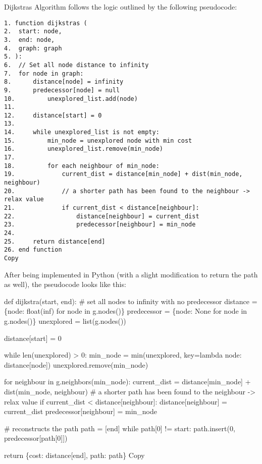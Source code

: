 \documentclass[
]{article}
\newenvironment{Shaded}{}{}
\newcommand{\NormalTok}[1]{#1}
\begin{document}
Dijkstra\textquotesingle s Algorithm follows the logic outlined by the
following pseudocode:

\begin{verbatim}
1. function dijkstras (
2.  start: node, 
3.  end: node,
4.  graph: graph
5. ):
6.  // Set all node distance to infinity
7.  for node in graph:
8.      distance[node] = infinity
9.      predecessor[node] = null
10.         unexplored_list.add(node)
11.         
12.     distance[start] = 0
13.     
14.     while unexplored_list is not empty:
15.         min_node = unexplored node with min cost
16.         unexplored_list.remove(min_node)
17.         
18.         for each neighbour of min_node:
19.             current_dist = distance[min_node] + dist(min_node, neighbour)
20.             // a shorter path has been found to the neighbour -> relax value
21.             if current_dist < distance[neighbour]:
22.                 distance[neighbour] = current_dist
23.                 predecessor[neighbour] = min_node
24.     
25.     return distance[end]
26. end function
Copy
\end{verbatim}

After being implemented in Python (with a slight modification to return
the path as well), the pseudocode looks like this:

\begin{Shaded}
\begin{Highlighting}[]
\NormalTok{def dijkstra(start, end):}
\NormalTok{    \# set all nodes to infinity with no predecessor}
\NormalTok{    distance = \{node: float(\textquotesingle{}inf\textquotesingle{}) for node in g.nodes()\}}
\NormalTok{    predecessor = \{node: None for node in g.nodes()\}}
\NormalTok{    unexplored = list(g.nodes())}

\NormalTok{    distance[start] = 0}

\NormalTok{    while len(unexplored) \textgreater{} 0:}
\NormalTok{        min\_node = min(unexplored, key=lambda node: distance[node])}
\NormalTok{        unexplored.remove(min\_node)}

\NormalTok{        for neighbour in g.neighbors(min\_node):}
\NormalTok{            current\_dist = distance[min\_node] + dist(min\_node, neighbour)}
\NormalTok{            \# a shorter path has been found to the neighbour {-}\textgreater{} relax value}
\NormalTok{            if current\_dist \textless{} distance[neighbour]:}
\NormalTok{                distance[neighbour] = current\_dist}
\NormalTok{                predecessor[neighbour] = min\_node}

\NormalTok{    \# reconstructs the path}
\NormalTok{    path = [end]}
\NormalTok{    while path[0] != start:}
\NormalTok{        path.insert(0, predecessor[path[0]])}

\NormalTok{    return \{\textquotesingle{}cost\textquotesingle{}: distance[end], \textquotesingle{}path\textquotesingle{}: path\}}
\NormalTok{Copy}
\end{Highlighting}
\end{Shaded}
\end{document}
